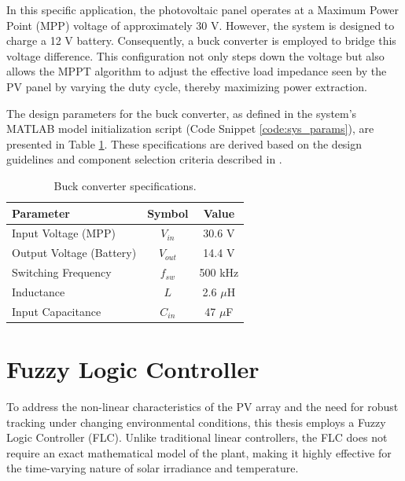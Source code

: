 \documentclass[a4paper,oneside,12pt]{report}
\numberwithin{equation}{chapter}
\begin{document}
In this specific application, the photovoltaic panel operates at a Maximum Power Point (MPP) voltage of approximately 30 V. However, the system is designed to charge a 12 V battery. Consequently, a buck converter is employed to bridge this voltage difference. This configuration not only steps down the voltage but also allows the MPPT algorithm to adjust the effective load impedance seen by the PV panel by varying the duty cycle, thereby maximizing power extraction.

The design parameters for the buck converter, as defined in the system's MATLAB model initialization script (Code Snippet \ref{code:sys_params}), are presented in Table \ref{tab:buck_params}. These specifications are derived based on the design guidelines and component selection criteria described in \cite{EricksonBook, RashidBook, TIReport}.

\begin{table}[H]
    \centering
    \caption{Buck converter specifications.}\label{tab:buck_params}
    \vspace{0.5\baselineskip}
    \begin{tabular}{|l|c|c|}
        \hline
        Parameter & Symbol & Value \\
        \hline
        Input Voltage (MPP) & $V_{in}$ & 30.6 V \\
        \hline
        Output Voltage (Battery) & $V_{out}$ & 14.4 V \\
        \hline
        Switching Frequency & $f_{sw}$ & 500 kHz \\
        \hline
        Inductance & $L$ & 2.6 $\mu$H \\
        \hline
        Input Capacitance & $C_{in}$ & 47 $\mu$F \\
        \hline
    \end{tabular}
\end{table}

\section{Fuzzy Logic Controller}\label{sec:matlab_flc}
To address the non-linear characteristics of the PV array and the need for robust tracking under changing environmental conditions, this thesis employs a Fuzzy Logic Controller (FLC). Unlike traditional linear controllers, the FLC does not require an exact mathematical model of the plant, making it highly effective for the time-varying nature of solar irradiance and temperature.
\end{document}
